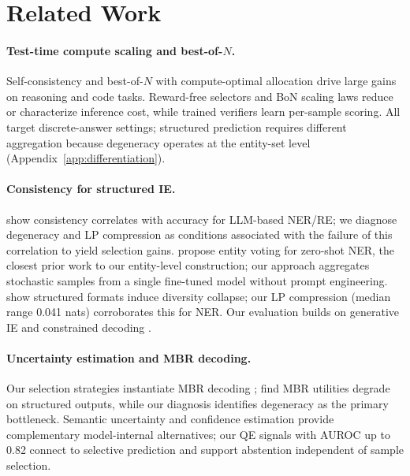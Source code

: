 \section{Related Work}\label{sec:related}

\paragraph{Test-time compute scaling and best-of-$N$.}
Self-consistency \cite{wang2023selfconsistency} and best-of-$N$ with compute-optimal allocation \cite{snell2025scaling, brown2024monkeys} drive large gains on reasoning and code tasks.
Reward-free selectors \cite{taubenfeld2025cisc, kang2025selfcertainty} and BoN scaling laws \cite{gao2023scaling} reduce or characterize inference cost, while trained verifiers \cite{cobbe2021verifiers, lightman2024verify} learn per-sample scoring.
All target discrete-answer settings; structured prediction requires different aggregation because degeneracy operates at the entity-set level (Appendix~\ref{app:differentiation}).

\paragraph{Consistency for structured IE.}
\citet{yao2026consistency} show consistency correlates with accuracy for LLM-based NER/RE; we diagnose degeneracy and LP compression as conditions associated with the failure of this correlation to yield selection gains.
\citet{xie2023zeroshot} propose entity voting for zero-shot NER, the closest prior work to our entity-level construction; our approach aggregates stochastic samples from a single fine-tuned model without prompt engineering.
\citet{yun2025price} show structured formats induce diversity collapse; our LP compression (median range 0.041 nats) corroborates this for NER.
Our evaluation builds on generative IE \cite{zhou2024uniner, sainz2024gollie} and constrained decoding \cite{willard2023guided, dong2024xgrammar}.

\paragraph{Uncertainty estimation and MBR decoding.}
Our selection strategies instantiate MBR decoding \cite{eikema2022sampling}; \citet{eikema2025structured} find MBR utilities degrade on structured outputs, while our diagnosis identifies degeneracy as the primary bottleneck.
Semantic uncertainty \cite{kuhn2023semantic} and confidence estimation \cite{geng2024confidence, xia2025survey} provide complementary model-internal alternatives; our QE signals with AUROC up to 0.82 connect to selective prediction \cite{geifman2017selective} and support abstention independent of sample selection.
